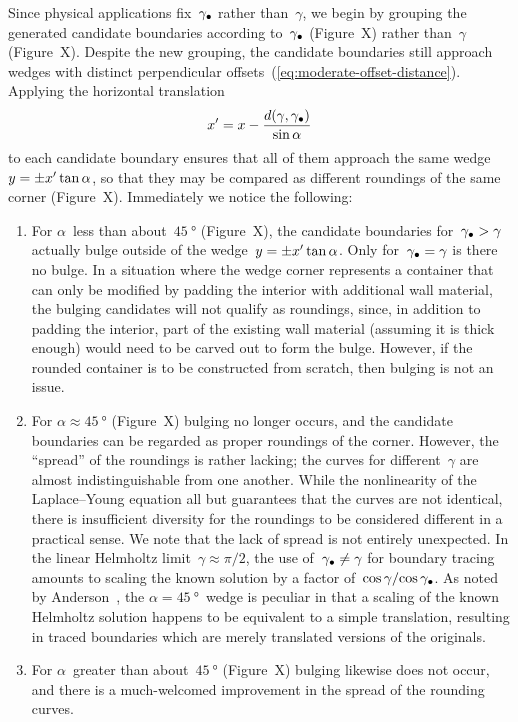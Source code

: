 Since physical applications fix~$\gamma_\bullet$ rather than~$\gamma$,
we begin by grouping the generated candidate boundaries
according to~$\gamma_\bullet$
(Figure~X) %
rather than~$\gamma$
(Figure~X). %
Despite the new grouping,
the candidate boundaries still approach wedges
with distinct perpendicular offsets~(\ref{eq:moderate-offset-distance}).
Applying the horizontal translation
\begin{equation}
  x' = x - \frac{d (\gamma, \gamma_\bullet)}{\sin\alpha}
  \label{eq:moderate-horizontal-translation}
\end{equation}
to each candidate boundary
ensures that all of them approach
the same wedge~$y = \pm x' \tan\alpha$,
so that they may be compared as different roundings
of the same corner
(Figure~X). %
Immediately we notice the following:
\begin{enumerate}
  \item
    For $\alpha$~less than about~$\SI{45}{\degree}$
    (Figure~X), %
    the candidate boundaries for~$\gamma_\bullet > \gamma$
    actually bulge outside of the wedge~$y = \pm x' \tan\alpha$.
    Only for~$\gamma_\bullet = \gamma$ is there no bulge.
    In a situation where the wedge corner represents a container
    that can only be modified by padding the interior
    with additional wall material,
    the bulging candidates will not qualify as roundings,
    since, in addition to padding the interior,
    part of the existing wall material
    (assuming it is thick enough)
    would need to be carved out to form the bulge.
    However, if the rounded container is to be constructed from scratch,
    then bulging is not an issue.
  \item
    For $\alpha \approx \SI{45}{\degree}$
    (Figure~X) %
    bulging no longer occurs,
    and the candidate boundaries can be regarded
    as proper roundings of the corner.
    However, the ``spread'' of the roundings is rather lacking;
    the curves for different~$\gamma$ are almost indistinguishable
    from one another.
    While the nonlinearity of the Laplace--Young equation all but guarantees
    that the curves are not identical,
    there is insufficient diversity
    for the roundings to be considered different in a practical sense.
    We note that the lack of spread is not entirely unexpected.
    In the linear Helmholtz limit~$\gamma \approx \pi/2$,
    the use of~$\gamma_\bullet \ne \gamma$ for boundary tracing
    amounts to scaling the known solution
    by a factor of~$\cos\gamma / {\cos\gamma_\bullet}$.
    As noted by Anderson~\cite[(7.8)]{
      anderson-2002-thesis-boundary-tracing-pdes
    },
    the $\alpha = \SI{45}{\degree}$~wedge is peculiar
    in that a scaling of the known Helmholtz solution
    happens to be equivalent to a simple translation,
    resulting in traced boundaries which are merely translated versions
    of the originals.
  \item
    For $\alpha$~greater than about~$\SI{45}{\degree}$
    (Figure~X)
    bulging likewise does not occur,
    and there is a much-welcomed improvement
    in the spread of the rounding curves.
\end{enumerate}

